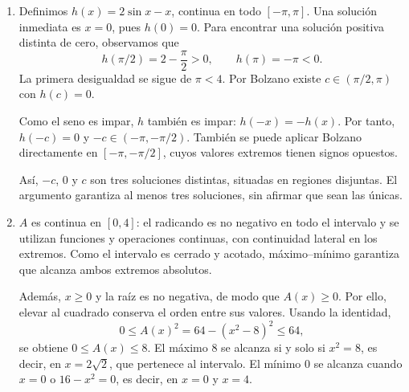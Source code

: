 \documentclass[10pt,a5paper]{article}
\begin{document}
\begin{enumerate}
  \item Definimos $h(x)=2\sin x-x$, continua en todo $[-\pi,\pi]$. Una solución inmediata es $x=0$, pues $h(0)=0$. Para encontrar una solución positiva distinta de cero, observamos que
  \[
    h(\pi/2)=2-\frac\pi2>0,\qquad h(\pi)=-\pi<0.
  \]
  La primera desigualdad se sigue de $\pi<4$. Por Bolzano existe $c\in(\pi/2,\pi)$ con $h(c)=0$.

  Como el seno es impar, $h$ también es impar: $h(-x)=-h(x)$. Por tanto, $h(-c)=0$ y $-c\in(-\pi,-\pi/2)$. También se puede aplicar Bolzano directamente en $[-\pi,-\pi/2]$, cuyos valores extremos tienen signos opuestos.

  Así, $-c$, $0$ y $c$ son tres soluciones distintas, situadas en regiones disjuntas. El argumento garantiza al menos tres soluciones, sin afirmar que sean las únicas.
  \item $A$ es continua en $[0,4]$: el radicando es no negativo en todo el intervalo y se utilizan funciones y operaciones continuas, con continuidad lateral en los extremos. Como el intervalo es cerrado y acotado, máximo--mínimo garantiza que alcanza ambos extremos absolutos.

  Además, $x\geq0$ y la raíz es no negativa, de modo que $A(x)\geq0$. Por ello, elevar al cuadrado conserva el orden entre sus valores. Usando la identidad,
  \[
    0\leq A(x)^2=64-(x^2-8)^2\leq64,
  \]
  se obtiene $0\leq A(x)\leq8$. El máximo $8$ se alcanza si y solo si $x^2=8$, es decir, en $x=2\sqrt2$, que pertenece al intervalo. El mínimo $0$ se alcanza cuando $x=0$ o $16-x^2=0$, es decir, en $x=0$ y $x=4$.
\end{enumerate}
\fi
\end{document}

